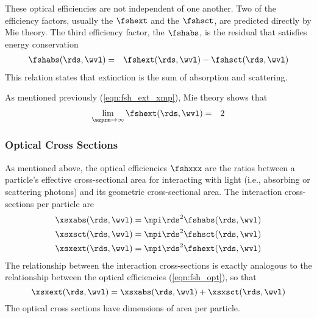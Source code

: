 \documentclass[12pt]{article}
\begin{document}
These optical efficiencies are not independent of one another.
Two of the efficiency factors, usually the  $\fshext$ and the 
$\fshsct$, are predicted directly by Mie theory.
The third efficiency factor, the 
$\fshabs$, is the residual that satisfies energy conservation
\begin{eqnarray}
\fshabs(\rds,\wvl) & = & \fshext(\rds,\wvl) - \fshsct(\rds,\wvl)
\label{eqn:fsh_abs_rsd}
\end{eqnarray}
This relation states that extinction is the sum of absorption and
scattering.

As mentioned previously (\ref{eqn:fsh_ext_xmp}), Mie theory shows that  
\begin{eqnarray}
\lim_{\szprm\to\infty} \fshext(\rds,\wvl) & = & 2
\label{eqn:fsh_ext_lmt}
\end{eqnarray}

\subsubsection[Optical Cross Sections]{Optical Cross Sections}\label{sxn:xsx_opt}
As mentioned above, the optical efficiencies $\fshxxx$ are the ratios
between a particle's effective cross-sectional area for interacting
with light (i.e., absorbing or scattering photons) and its geometric
cross-sectional area. 
The interaction cross-sections per particle are 
\begin{subequations}
\label{eqn:xsx_opt}
\begin{align}
\label{eqn:xsx_abs_dfn}
\xsxabs(\rds,\wvl) & = \mpi \rds^{2} \fshabs(\rds,\wvl) \\
\label{eqn:xsx_sct_dfn}
\xsxsct(\rds,\wvl) & = \mpi \rds^{2} \fshsct(\rds,\wvl) \\
\label{eqn:xsx_ext_dfn}
\xsxext(\rds,\wvl) & = \mpi \rds^{2} \fshext(\rds,\wvl)
\end{align}
\end{subequations} 
The relationship between the interaction cross-sections is exactly
analogous to the relationship between the optical efficiencies
(\ref{eqn:fsh_opt}), so that 
\begin{equation}
\xsxext(\rds,\wvl) = \xsxabs(\rds,\wvl) + \xsxsct(\rds,\wvl)
\label{eqn:tau_ext_dfn}
\end{equation}
The optical cross sections have dimensions of area per particle.
\end{document}
